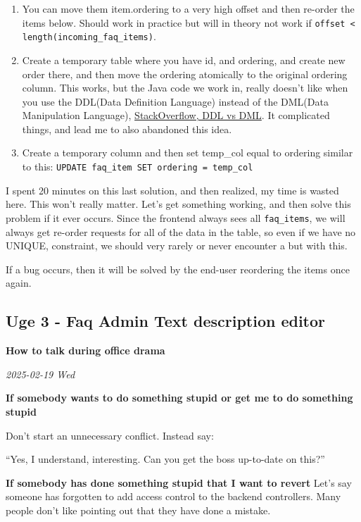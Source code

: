 \documentclass[../main.tex]{subfiles}
\begin{document}
\begin{enumerate}
\def\labelenumi{\arabic{enumi}.}
\item You can move them item.ordering to a very high offset and then re-order the items below. Should work in practice but will in theory not work if \verb|offset < length(incoming_faq_items)|. 

\item  Create a temporary table where you have id, and ordering, and create new order there, and then move the ordering atomically to the original ordering column. This works, but the Java code we work in, really doesn't like when you use the DDL(Data Definition Language) instead of the DML(Data Manipulation Language), \href{https://stackoverflow.com/questions/2578194/what-are-ddl-and-dml}{StackOverflow, DDL vs DML}. It complicated things, and lead me to also abandoned this idea.
\item Create a temporary column and then set temp\_col equal to ordering similar to this: \verb|UPDATE faq_item SET ordering = temp_col|
\end{enumerate}


I spent 20 minutes on this last solution, and then realized, my time is wasted here. This won't really matter. Let's get something working, and then solve this problem if it ever occurs. Since the frontend always sees all \verb|faq_items|, we will always get re-order requests for all of the data in the table, so even if we have no UNIQUE, constraint, we should very rarely or never encounter a but with this.

If a bug occurs, then it will be solved by the end-user reordering the items once again.\strut

\subsection{Uge 3 - Faq Admin Text description editor} 

\textbf{How to talk during office drama}

\textit{2025-02-19 Wed}

\textbf{If somebody wants to do something stupid or get me to do
something stupid}

Don't start an unnecessary conflict. Instead say:

``Yes, I understand, interesting. Can you get the boss up-to-date on
this?''

\textbf{If somebody has done something stupid that I want to revert} Let's say someone has forgotten to add access control to the backend controllers. Many people don't like pointing out that they have done a mistake.
\end{document}
